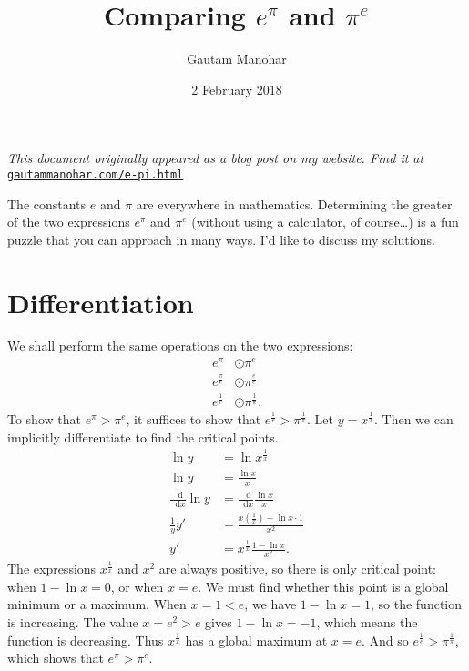 \documentclass[10pt,letterpaper,]{article}
\title{Comparing \(e^\pi\) and \(\pi^e\)}
\author{Gautam Manohar}
\date{2 February 2018}
\renewcommand\d{\mathop{}\!\mathrm{d}}
\newcommand{\diff}[2]{\frac{\d #1}{\d #2}}
\begin{document}
\maketitle
\emph{This document originally appeared as a blog post on my website. Find it at} \texttt{\href{http://gautammanohar.com/e-pi.html}{gautammanohar.com/e-pi.html}}

The constants \(e\) and \(\pi\) are everywhere in mathematics.
Determining the greater of the two expressions \(e^\pi\) and \(\pi^e\)
(without using a calculator, of course\ldots{}) is a fun puzzle that you
can approach in many ways. I'd like to discuss my solutions.

\hypertarget{differentiation}{%
\section{Differentiation}\label{differentiation}}

We shall perform the same operations on the two expressions:
\begin{equation}
    \begin{split}
        e^\pi &\odot \pi^e \\
        e^{\frac{\pi}{e}} &\odot \pi^{\frac{e}{e}} \\
        e^{\frac{1}{e}} &\odot \pi^{\frac{1}{\pi}}.
    \end{split}
\end{equation} To show that \(e^\pi > \pi^e\), it suffices to show that
\(e^{\frac{1}{e}} > \pi^{\frac{1}{\pi}}\). Let \(y = x^{\frac{1}{x}}\).
Then we can implicitly differentiate to find the critical points.
\begin{equation}
    \begin{split}
        \ln{y} &= \ln{x^{\frac{1}{x}}} \\
        \ln{y} &= \frac{\ln{x}}{x} \\
        \diff{}{x}\ln{y} &= \diff{}{x}\frac{\ln{x}}{x} \\
        \frac{1}{y}y' &= \frac{x\left(\frac{1}{x}\right) - \ln{x}\cdot1}{x^2} \\
        y' &= x^{\frac{1}{x}}\frac{1 - \ln{x}}{x^2}.
    \end{split}
\end{equation} The expressions \(x^{\frac{1}{x}}\) and \(x^2\) are
always positive, so there is only critical point: when
\(1 - \ln{x} = 0\), or when \(x = e\). We must find whether this point
is a global minimum or a maximum. When \(x = 1 < e\), we have
\(1 - \ln{x} = 1\), so the function is increasing. The value
\(x = e^2 > e\) gives \(1 - \ln{x} = -1\), which means the function is
decreasing. Thus \(x^{\frac{1}{x}}\) has a global maximum at \(x = e\).
And so \(e^{\frac{1}{e}} > \pi^{\frac{1}{\pi}}\), which shows that
\(e^\pi > \pi^e\).
\end{document}
